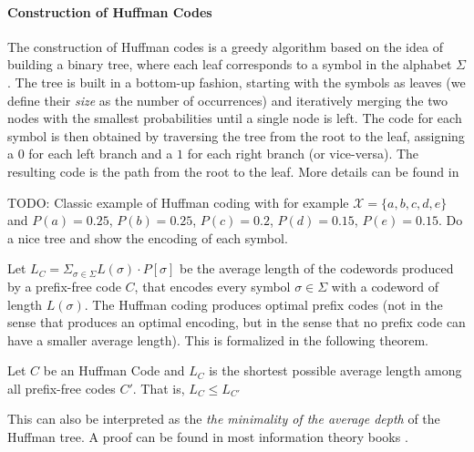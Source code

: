 \paragraph*{Construction of Huffman Codes} The construction of Huffman codes is a greedy algorithm based on the idea of building a binary tree, where each leaf corresponds to a symbol in the alphabet $\Sigma$. The tree is built in a bottom-up fashion, starting with the symbols as leaves (we define their \emph{size} as the number of occurrences) and iteratively merging the two nodes with the smallest probabilities until a single node is left. The code for each symbol is then obtained by traversing the tree from the root to the leaf, assigning a $0$ for each left branch and a $1$ for each right branch (or vice-versa). The resulting code is the path from the root to the leaf. More details can be found in \cite{ferragina2023pearls,sayood2002lossless,han2002mathematics,ElementsofInformationTheory} \vspace{0.4cm}

\begin{example}
    TODO: Classic example of Huffman coding with for example $\mathcal{X} = \{a,b,c,d,e\}$ and $P(a)= 0.25$, $P(b)=0.25$, $P(c)=0.2$, $P(d)=0.15$, $P(e)=0.15$. Do a nice tree and show the encoding of each symbol.
\end{example}

\noindent Let $L_C = \Sigma_{\sigma \in \Sigma} L(\sigma) \cdot P[\sigma]$ be the average length of the codewords produced by a prefix-free code $C$, that encodes every symbol $\sigma \in \Sigma$ with a codeword of length $L(\sigma)$. The Huffman coding produces optimal prefix codes (not in the sense that produces an optimal encoding, but in the sense that no prefix code can have a smaller average length). This is formalized in the following theorem.

\begin{theorem} \label{thm:huffman_optimality}
    Let $C$ be an Huffman Code and $L_C$ is the shortest possible average length among all prefix-free codes $C'$. That is, $L_C \leq L_{C'}$
\end{theorem}

\noindent This can also be interpreted as the \emph{the minimality of the average depth} of the Huffman tree. A proof can be found in most information theory books \cite{ferragina2023pearls,sayood2002lossless,han2002mathematics,ElementsofInformationTheory}. \vspace{0.4cm}


